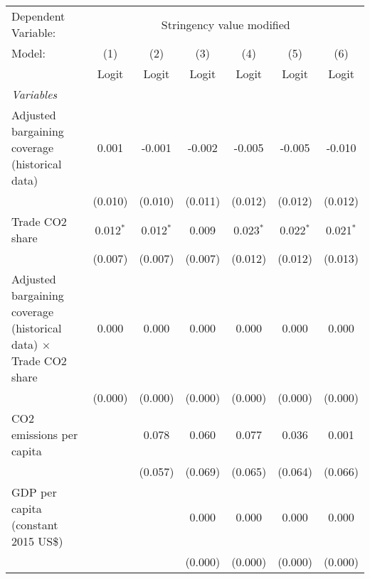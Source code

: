 
\begingroup
\centering
\begin{tabular}{lcccccc}
   \toprule
   Dependent Variable: & \multicolumn{6}{c}{Stringency value modified}\\
   Model:                                                                   & (1)         & (2)         & (3)     & (4)           & (5)         & (6)\\  
                                                                            &  Logit      & Logit       & Logit   & Logit         & Logit       & Logit\\  
   \midrule
   \emph{Variables}\\
   Adjusted bargaining coverage (historical data)                           & 0.001       & -0.001      & -0.002  & -0.005        & -0.005      & -0.010\\   
                                                                            & (0.010)     & (0.010)     & (0.011) & (0.012)       & (0.012)     & (0.012)\\   
   Trade CO2 share                                                          & 0.012$^{*}$ & 0.012$^{*}$ & 0.009   & 0.023$^{*}$   & 0.022$^{*}$ & 0.021$^{*}$\\   
                                                                            & (0.007)     & (0.007)     & (0.007) & (0.012)       & (0.012)     & (0.013)\\   
   Adjusted bargaining coverage (historical data) $\times$ Trade CO2 share  & 0.000       & 0.000       & 0.000   & 0.000         & 0.000       & 0.000\\   
                                                                            & (0.000)     & (0.000)     & (0.000) & (0.000)       & (0.000)     & (0.000)\\   
   CO2 emissions per capita                                                 &             & 0.078       & 0.060   & 0.077         & 0.036       & 0.001\\   
                                                                            &             & (0.057)     & (0.069) & (0.065)       & (0.064)     & (0.066)\\   
   GDP per capita (constant 2015 US\$)                                      &             &             & 0.000   & 0.000         & 0.000       & 0.000\\   
                                                                            &             &             & (0.000) & (0.000)       & (0.000)     & (0.000)\\   

\end{tabular}
